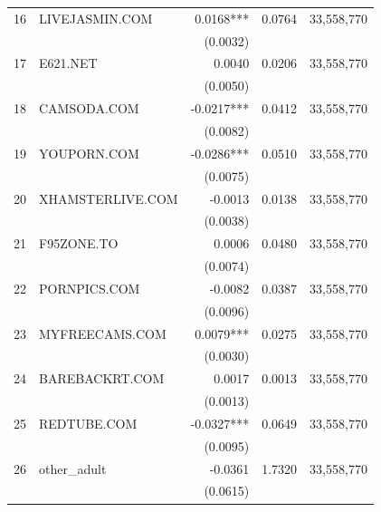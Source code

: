 \begin{tabular}{rlrrl}
  16 & LIVEJASMIN.COM & 0.0168*** & 0.0764 & 33,558,770 \\
    &   & (0.0032) &   &   \\
  17 & E621.NET & 0.0040 & 0.0206 & 33,558,770 \\
    &   & (0.0050) &   &   \\
  18 & CAMSODA.COM & -0.0217*** & 0.0412 & 33,558,770 \\
    &   & (0.0082) &   &   \\
  19 & YOUPORN.COM & -0.0286*** & 0.0510 & 33,558,770 \\
    &   & (0.0075) &   &   \\
  20 & XHAMSTERLIVE.COM & -0.0013 & 0.0138 & 33,558,770 \\
    &   & (0.0038) &   &   \\
  21 & F95ZONE.TO & 0.0006 & 0.0480 & 33,558,770 \\
    &   & (0.0074) &   &   \\
  22 & PORNPICS.COM & -0.0082 & 0.0387 & 33,558,770 \\
    &   & (0.0096) &   &   \\
  23 & MYFREECAMS.COM & 0.0079*** & 0.0275 & 33,558,770 \\
    &   & (0.0030) &   &   \\
  24 & BAREBACKRT.COM & 0.0017 & 0.0013 & 33,558,770 \\
    &   & (0.0013) &   &   \\
  25 & REDTUBE.COM & -0.0327*** & 0.0649 & 33,558,770 \\
    &   & (0.0095) &   &   \\
  26 & other\_adult & -0.0361 & 1.7320 & 33,558,770 \\
    &   & (0.0615) &   &   \\
\bottomrule
\end{tabular}
